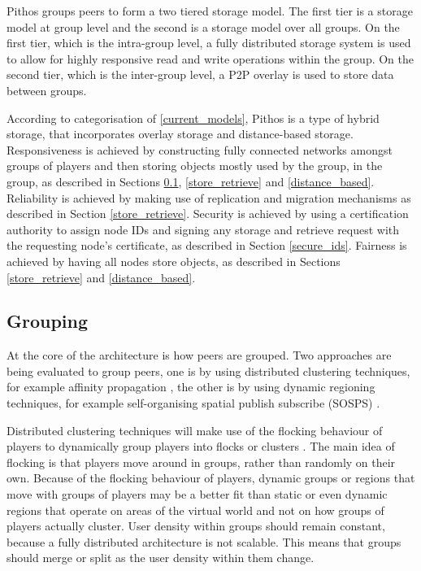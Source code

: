 \documentclass[10pt,a4paper,conference]{IEEEtran}
\begin{document}
Pithos groups peers to form a two tiered storage model. The first tier is a storage model at group level and the second is a storage model over all
groups. On the first tier, which is the intra-group level, a fully distributed storage system is used to allow for highly responsive read and write
operations within the group. On the second tier, which is the inter-group level, a P2P overlay is used to store data between groups.

According to categorisation of \ref{current_models}, Pithos is a type of hybrid storage, that incorporates overlay storage and distance-based
storage. Responsiveness is achieved by constructing fully connected networks amongst groups of players and then storing objects mostly used by the
group, in the group, as described in Sections \ref{grouping}, \ref{store_retrieve} and \ref{distance_based}. Reliability is achieved by making use of
replication and migration mechanisms as described in Section \ref{store_retrieve}. Security is achieved by using a certification authority to assign
node IDs and signing any storage and retrieve request with the requesting node's certificate, as described in Section \ref{secure_ids}. Fairness is
achieved by having all nodes store objects, as described in Sections \ref{store_retrieve} and \ref{distance_based}.

\subsection{Grouping}
\label{grouping}

At the core of the architecture is how peers are grouped. Two approaches are being evaluated to group peers, one is by using distributed clustering
techniques, for example affinity propagation \cite{affinity_propagation}, the other is by using dynamic regioning techniques, for example
self-organising spatial publish subscribe (SOSPS) \cite{self_organising_sps_post}.

Distributed clustering techniques will make use of the flocking behaviour of players to dynamically group players into flocks or clusters
\cite{flocking}. The main idea of flocking is that players move around in groups, rather than randomly on their own. Because of the flocking
behaviour of players, dynamic groups or regions that move with groups of players may be a better fit than static or even dynamic regions that operate
on areas of the virtual world and not on how groups of players actually cluster. User density within groups should remain constant, because a fully
distributed architecture is not scalable. This means that groups should merge or split as the user density within them change.
\end{document}
